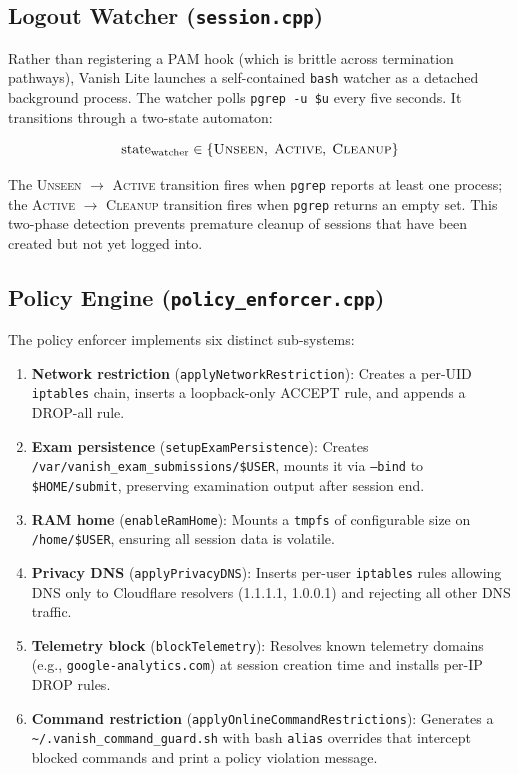 \subsection{Logout Watcher (\texttt{session.cpp})}

Rather than registering a PAM hook (which is brittle across termination pathways), Vanish Lite launches a self-contained \texttt{bash} watcher as a detached background process. The watcher polls \texttt{pgrep -u \$u} every five seconds. It transitions through a two-state automaton:

\begin{equation}
    \text{state}_{\text{watcher}} \in \{\textsc{Unseen},\; \textsc{Active},\; \textsc{Cleanup}\}
\end{equation}

The \textsc{Unseen} $\to$ \textsc{Active} transition fires when \texttt{pgrep} reports at least one process; the \textsc{Active} $\to$ \textsc{Cleanup} transition fires when \texttt{pgrep} returns an empty set. This two-phase detection prevents premature cleanup of sessions that have been created but not yet logged into.

\subsection{Policy Engine (\texttt{policy\_enforcer.cpp})}

The policy enforcer implements six distinct sub-systems:

\begin{enumerate}
    \item \textbf{Network restriction} (\texttt{applyNetworkRestriction}): Creates a per-UID \texttt{iptables} chain, inserts a loopback-only ACCEPT rule, and appends a DROP-all rule.
    \item \textbf{Exam persistence} (\texttt{setupExamPersistence}): Creates \texttt{/var/vanish\_exam\_submissions/\allowbreak \$USER}, mounts it via \texttt{--bind} to \texttt{\$HOME/submit}, preserving examination output after session end.
    \item \textbf{RAM home} (\texttt{enableRamHome}): Mounts a \texttt{tmpfs} of configurable size on \texttt{/home/\$USER}, ensuring all session data is volatile.
    \item \textbf{Privacy DNS} (\texttt{applyPrivacyDNS}): Inserts per-user \texttt{iptables} rules allowing DNS only to Cloudflare resolvers (1.1.1.1, 1.0.0.1) and rejecting all other DNS traffic.
    \item \textbf{Telemetry block} (\texttt{blockTelemetry}): Resolves known telemetry domains (e.g., \texttt{google-analytics.com}) at session creation time and installs per-IP DROP rules.
    \item \textbf{Command restriction} (\texttt{applyOnlineCommandRestrictions}): Generates a \texttt{\textasciitilde/.vanish\_command\_guard.sh} with bash \texttt{alias} overrides that intercept blocked commands and print a policy violation message.
\end{enumerate}

